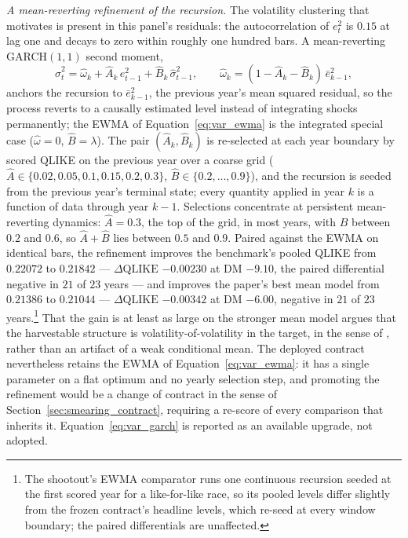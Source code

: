 \emph{A mean-reverting refinement of the recursion.} The volatility
clustering that motivates \citet{CorsiMittnikPigorschPigorsch2008} is
present in this panel's residuals: the autocorrelation of $e_t^2$ is
$0.15$ at lag one and decays to zero within roughly one hundred bars.
A mean-reverting GARCH$(1,1)$ second moment,
\begin{equation}
    \hat{\sigma}^2_t
    = \hat\omega_k + \hat{A}_k\, e_{t-1}^2
      + \hat{B}_k\, \hat{\sigma}^2_{t-1},
    \qquad
    \hat\omega_k = (1 - \hat{A}_k - \hat{B}_k)\,\bar{e}^2_{k-1},
    \label{eq:var_garch}
\end{equation}
anchors the recursion to $\bar{e}^2_{k-1}$, the previous year's mean
squared residual, so the process reverts to a causally estimated level
instead of integrating shocks permanently; the EWMA of
Equation~\eqref{eq:var_ewma} is the integrated special case
($\hat\omega = 0$, $\hat{B} = \lambda$). The pair
$(\hat{A}_k, \hat{B}_k)$ is re-selected at each year boundary by
scored QLIKE on the previous year over a coarse grid
($\hat{A} \in \{0.02, 0.05, 0.1, 0.15, 0.2, 0.3\}$,
$\hat{B} \in \{0.2, \dots, 0.9\}$), and the recursion is seeded from
the previous year's terminal state; every quantity applied in year $k$
is a function of data through year $k-1$. Selections concentrate at
persistent mean-reverting dynamics: $\hat{A} = 0.3$, the top of the
grid, in most years, with $\hat{B}$ between $0.2$ and $0.6$, so
$\hat{A} + \hat{B}$ lies between $0.5$ and $0.9$. Paired against the
EWMA on identical bars, the refinement improves the benchmark's pooled
QLIKE from $0.22072$ to $0.21842$ --- $\Delta\mathrm{QLIKE}$
$-0.00230$ at DM $-9.10$, the paired differential negative in $21$ of
$23$ years --- and improves the paper's best mean model from
$0.21386$ to $0.21044$ --- $\Delta\mathrm{QLIKE}$ $-0.00342$ at DM
$-6.00$, negative in $21$ of $23$ years.\footnote{The shootout's EWMA
comparator runs one continuous recursion seeded at the first scored
year for a like-for-like race, so its pooled levels differ slightly
from the frozen contract's headline levels, which re-seed at every
window boundary; the paired differentials are unaffected.} That the
gain is at least as large on the stronger mean model argues that the
harvestable structure is volatility-of-volatility in the target, in
the sense of \citet{CorsiMittnikPigorschPigorsch2008}, rather than an
artifact of a weak conditional mean. The deployed contract
nevertheless retains the EWMA of Equation~\eqref{eq:var_ewma}: it has
a single parameter on a flat optimum and no yearly selection step, and
promoting the refinement would be a change of contract in the sense of
Section~\ref{sec:smearing_contract}, requiring a re-score of every
comparison that inherits it. Equation~\eqref{eq:var_garch} is reported
as an available upgrade, not adopted.

